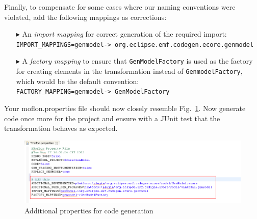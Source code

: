 Finally, to compensate for some cases where our naming conventions were violated, add the following mappings as corrections:

\begin{enumerate}
\item[$\blacktriangleright$] An \emph{import mapping} for correct generation of the required import:\\
\texttt{\tiny IMPORT\_MAPPINGS=genmodel-> org.eclipse.emf.codegen.ecore.genmodel}
\item [$\blacktriangleright$] A \emph{factory mapping} to ensure that \texttt{GenModelFactory} is used as the factory for creating elements in the transformation instead of \texttt{Genmodel\-Factory}, which would be the default convention:\\
\texttt{\tiny FACTORY\_MAPPING=genmodel-> GenModelFactory}
\end{enumerate}

Your \textsf{moflon.properties} file should now closely resemble Fig.~\ref{fig_mofProp}.
Now generate code once more for the project and ensure with a JUnit test that the transformation behaves as expected.

\begin{figure}[htbp]
\begin{center}  \includegraphics[width=1.3\textwidth]{pics/Ecore2GenModel/9_mofProperties.png}
  \caption{Additional properties for code generation}  
  \label{fig_mofProp}
\end{center}
\end{figure} 

\clearpage




